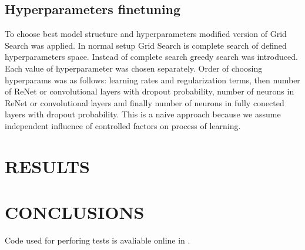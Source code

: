 \documentclass[a4paper, 10 pt, conference]{ieeeconf}
\begin{document}
\subsection{Hyperparameters finetuning}

To choose best model structure and hyperparameters modified version of Grid Search was applied. In normal setup Grid Search is complete search of defined hyperparameters space. Instead of complete search greedy search was introduced. Each value of hyperparameter was chosen separately. Order of choosing hyperparams was as follows: learning rates and regularization terms, then number of ReNet or convolutional layers with dropout probability, number of neurons in ReNet or convolutional layers and finally number of neurons in fully conected layers with dropout probability. This is a naive approach because we assume independent influence of controlled factors on process of learning. 

\section{RESULTS}

\section{CONCLUSIONS}


Code used for perforing tests is avaliable online in \cite{repo}.




\end{document}
